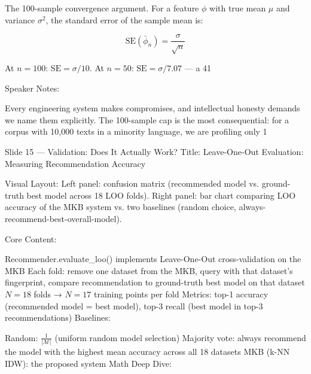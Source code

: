 The 100-sample convergence argument. For a feature $\phi$ with true mean $\mu$ and variance $\sigma^2$, the standard error of the sample mean is:

$$\text{SE}(\bar{\phi}_n) = \frac{\sigma}{\sqrt{n}}$$

At $n=100$: $\text{SE} = \sigma/10$. At $n=50$: $\text{SE} = \sigma/7.07$ — a 41%

Speaker Notes:

Every engineering system makes compromises, and intellectual honesty demands we name them explicitly. The 100-sample cap is the most consequential: for a corpus with 10,000 texts in a minority language, we are profiling only 1%

Slide 15 — Validation: Does It Actually Work?
Title: Leave-One-Out Evaluation: Measuring Recommendation Accuracy

Visual Layout: Left panel: confusion matrix (recommended model vs. ground-truth best model across 18 LOO folds). Right panel: bar chart comparing LOO accuracy of the MKB system vs. two baselines (random choice, always-recommend-best-overall-model).

Core Content:

Recommender.evaluate_loo() implements Leave-One-Out cross-validation on the MKB
Each fold: remove one dataset from the MKB, query with that dataset's fingerprint, compare recommendation to ground-truth best model on that dataset
$N=18$ folds → $N=17$ training points per fold
Metrics: top-1 accuracy (recommended model = best model), top-3 recall (best model in top-3 recommendations)
Baselines:

Random: $\frac{1}{|\mathcal{M}|}$ (uniform random model selection)
Majority vote: always recommend the model with the highest mean accuracy across all 18 datasets
MKB (k-NN IDW): the proposed system
Math Deep Dive:

